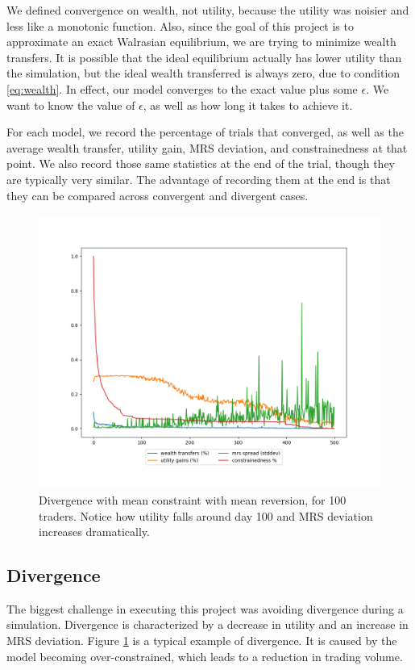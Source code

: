 \documentclass[12pt,a4paper,titlepage]{article}
\begin{document}
We defined convergence on wealth, not utility, because the utility was noisier and less like a monotonic function.
Also, since the goal of this project is to approximate an exact Walrasian equilibrium, we are trying to minimize wealth transfers.
It is possible that the ideal equilibrium actually has lower utility than the simulation, but the ideal wealth transferred is always zero, due to condition \ref{eq:wealth}.
In effect, our model converges to the exact value plus some $\epsilon$.
We want to know the value of $\epsilon$, as well as how long it takes to achieve it.

For each model, we record the percentage of trials that converged, as well as the average wealth transfer, utility gain, MRS deviation, and constrainedness at that point.
We also record those same statistics at the end of the trial, though they are typically very similar.
The advantage of recording them at the end is that they can be compared across convergent and divergent cases.

\begin{figure}[H]
    \centering
    \includegraphics[width=\textwidth]{seed_0.png}
    \caption{
      Divergence with mean constraint with mean reversion, for 100 traders.
      Notice how utility falls around day 100 and MRS deviation increases dramatically.
    }
    \label{fig:div}
\end{figure}

\subsection{Divergence}
The biggest challenge in executing this project was avoiding divergence during a simulation.
Divergence is characterized by a decrease in utility and an increase in MRS deviation.
Figure \ref{fig:div} is a typical example of divergence. 
It is caused by the model becoming over-constrained, which leads to a reduction in trading volume.
\end{document}
